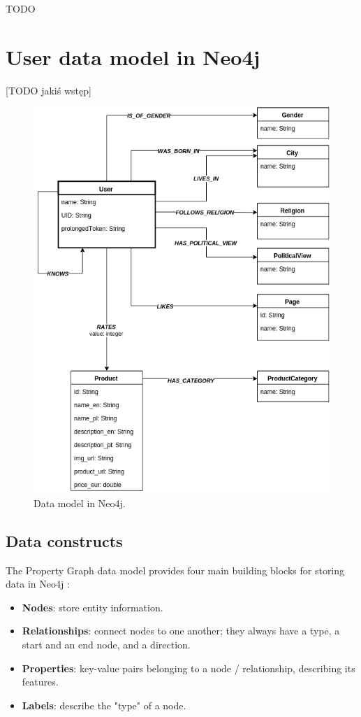 \documentclass[12pt]{report}
\begin{document}
\hbox{TODO}

%
\section{User data model in Neo4j}

[TODO jakiś wstęp]

\begin{figure}[!t]
\centering
\includegraphics[width=\textwidth]{neo4j_data_model3.png} 
\caption[Data model in Neo4j.]{Data model in Neo4j.}
\label{fig.data_model}
\end{figure}

\subsection{Data constructs}

The Property Graph data model provides four main building blocks for storing data in Neo4j \cite{learning_neo4j}:
\begin{itemize}
\item {\bf Nodes}: store entity information.
\item {\bf Relationships}: connect nodes to one another; they always have a type, a start and an end node, and a direction.
\item {\bf Properties}: key-value pairs belonging to a node / relationship, describing its features.
\item {\bf Labels}: describe the "type" of a node.
\end{itemize}
\end{document}
